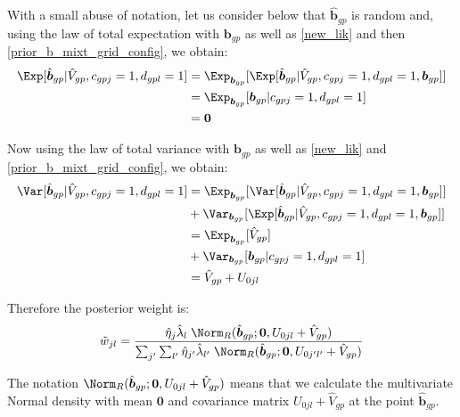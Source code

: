 \documentclass[11pt, oneside]{article}   	%
\begin{document}
With a small abuse of notation, let us consider below that $\hat{\bm{b}}_{gp}$ is random and, using the law of total expectation with $\bm{b}_{gp}$ as well as \ref{new_lik} and then \ref{prior_b_mixt_grid_config}, we obtain:
\begin{equation}
  \begin{aligned}
    \Exp[\hat{\bm{b}}_{gp} | \hat{V}_{gp}, c_{gpj}=1, d_{gpl}=1] &= \Exp_{\bm{b}_{gp}}[ \Exp[\hat{\bm{b}}_{gp} | \hat{V}_{gp}, c_{gpj}=1, d_{gpl}=1, \bm{b}_{gp}] ]\\
    &= \Exp_{\bm{b}_{gp}}[\bm{b}_{gp} | c_{gpj}=1, d_{gpl}=1] \\
    &= \bm{0}
  \end{aligned}
\end{equation}

Now using the law of total variance with $\bm{b}_{gp}$ as well as \ref{new_lik} and \ref{prior_b_mixt_grid_config}, we obtain:
\begin{equation}
  \begin{aligned}
    \Var[\hat{\bm{b}}_{gp} | \hat{V}_{gp}, c_{gpj}=1, d_{gpl}=1] &= \Exp_{\bm{b}_{gp}}[ \Var[\hat{\bm{b}}_{gp} | \hat{V}_{gp}, c_{gpj}=1, d_{gpl}=1, \bm{b}_{gp}] ] \\
    &+ \Var_{\bm{b}_{gp}}[ \Exp[\hat{\bm{b}}_{gp} | \hat{V}_{gp}, c_{gpj}=1, d_{gpl}=1, \bm{b}_{gp}] ] \\
    &= \Exp_{\bm{b}_{gp}}[\hat{V}_{gp}] \\
    &+ \Var_{\bm{b}_{gp}}[\bm{b}_{gp} | c_{gpj}=1, d_{gpl}=1] \\
    &= \hat{V}_{gp} + U_{0jl}
  \end{aligned}
\end{equation}

Therefore the posterior weight is:
\begin{equation}
  \label{post_w_jl}
  \begin{aligned}
    \tilde{w}_{jl} = \frac{\hat{\eta}_j \hat{\lambda}_l \; \Norm_R(\hat{\bm{b}}_{gp}; \bm{0}, U_{0jl} + \hat{V}_{gp})}{\sum_{j'} \sum_{l'} \hat{\eta}_{j'}\hat{\lambda}_{l'} \; \Norm_R(\hat{\bm{b}}_{gp}; \bm{0}, U_{0j'l'} + \hat{V}_{gp})}
  \end{aligned}
\end{equation}

The notation $\Norm_R(\hat{\bm{b}}_{gp}; \bm{0}, U_{0jl} + \hat{V}_{gp})$ means that we calculate the multivariate Normal density with mean $\bm{0}$ and covariance matrix $U_{0jl} + \hat{V}_{gp}$ at the point $\hat{\bm{b}}_{gp}$.
\end{document}
